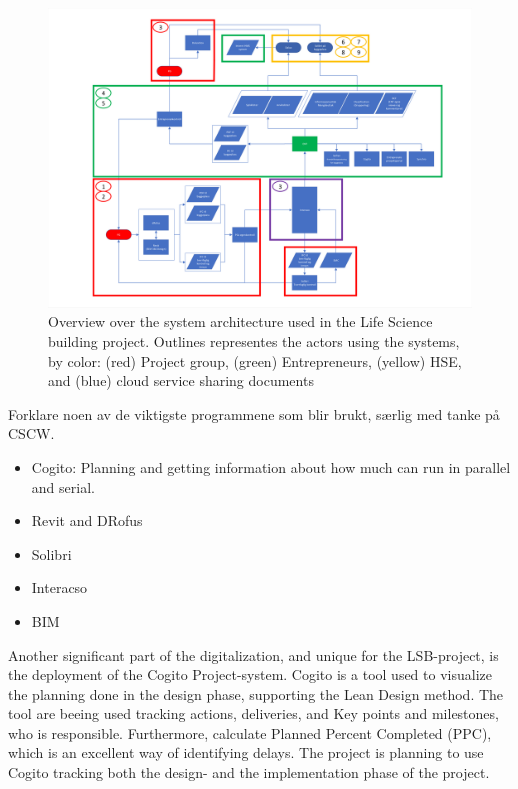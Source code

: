 \begin{figure}
    \centering
    \includegraphics[width=\textwidth]{fig/LVB_system-arkitektur.png}
    \caption{Overview over the system architecture used in the Life Science building project. Outlines representes the actors using the systems, by color: (red) Project group, (green) Entrepreneurs, (yellow) HSE, and (blue) cloud service sharing documents}
    \label{fig:LSB_systems}
\end{figure}

Forklare noen av de viktigste programmene som blir brukt, særlig med tanke på CSCW. 

\begin{itemize}
    \item Cogito: Planning and getting information about how much can run in parallel and serial. 
    \item Revit and DRofus
    \item Solibri
    \item Interacso
    \item BIM
\end{itemize}

Another significant part of the digitalization, and unique for the LSB-project, is the deployment of the Cogito Project-system. Cogito is a tool used to visualize the planning done in the design phase, supporting the Lean Design method. The tool are beeing used tracking actions, deliveries, and Key points and milestones, who is responsible. Furthermore, calculate Planned Percent Completed (PPC), which is an excellent way of identifying delays. The project is planning to use Cogito tracking both the design- and the implementation phase of the project.

